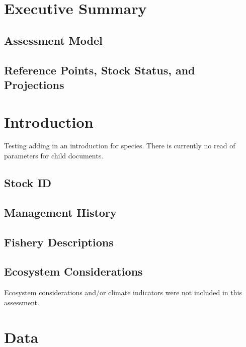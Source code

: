 \documentclass[
  letterpaper,
]{article}
\begin{document}
\section{Executive Summary}\label{sec-exec-sum}

\subsection{Assessment Model}\label{assessment-model}

\subsection{Reference Points, Stock Status, and
Projections}\label{reference-points-stock-status-and-projections}

\newpage{}

\section{Introduction}\label{sec-intro}

Testing adding in an introduction for species. There is currently no
read of parameters for child documents.

\subsection{Stock ID}\label{stock-id}

\subsection{Management History}\label{management-history}

\subsection{Fishery Descriptions}\label{fishery-descriptions}

\subsection{Ecosystem Considerations}\label{ecosystem-considerations}

Ecosystem considerations and/or climate indicators were not included in
this assessment.

\newpage{}

\section{Data}\label{sec-data}
\end{document}
